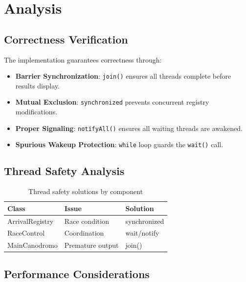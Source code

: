 \documentclass[10pt,a4paper,twocolumn]{article}
\begin{document}
\section{Analysis}

\subsection{Correctness Verification}

The implementation guarantees correctness through:

\begin{itemize}
    \item \textbf{Barrier Synchronization}: \texttt{join()} ensures all threads complete before results display.
    \item \textbf{Mutual Exclusion}: \texttt{synchronized} prevents concurrent registry modifications.
    \item \textbf{Proper Signaling}: \texttt{notifyAll()} ensures all waiting threads are awakened.
    \item \textbf{Spurious Wakeup Protection}: \texttt{while} loop guards the \texttt{wait()} call.
\end{itemize}

\subsection{Thread Safety Analysis}

\begin{table}[H]
    \centering
    \small
    \begin{tabular}{|l|l|l|}
        \hline
        \textbf{Class} & \textbf{Issue} & \textbf{Solution} \\
        \hline
        ArrivalRegistry & Race condition & synchronized \\
        \hline
        RaceControl & Coordination & wait/notify \\
        \hline
        MainCanodromo & Premature output & join() \\
        \hline
    \end{tabular}
    \caption{Thread safety solutions by component}
    \label{tab:safety}
\end{table}

\subsection{Performance Considerations}
\end{document}
